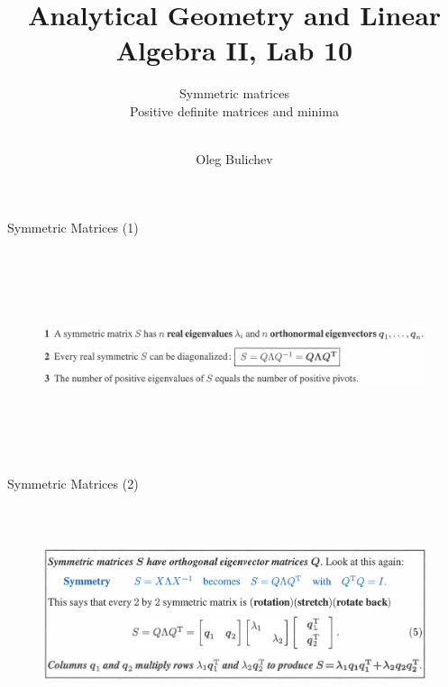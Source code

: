 \documentclass[aspectratio=169]{beamer}
\title[AGLA2]{Analytical Geometry and Linear Algebra II, Lab 10} %
\subtitle{Symmetric matrices \\ Positive definite matrices and minima \\ \ 
         } %
\author{Oleg Bulichev}
\newcommand{\fbckg}[1]{\usebackgroundtemplate{\texttt{[image: \#1]}}}%
\begin{document}
\setlength{\abovedisplayskip}{0pt}
\setlength{\belowdisplayskip}{0pt}
\setlength{\abovedisplayshortskip}{0pt}
\setlength{\belowdisplayshortskip}{0pt}

\fbckg{fibeamer/figs/title_page.png}

\fbckg{fibeamer/figs/common.png}

\begin{frame}[t]{Symmetric Matrices (1)}
\framesubtitle{}
    \begin{figure}[H]
        \centering\includegraphics[height=6cm,width=1\textwidth,keepaspectratio]{symmetric.png}
        \label{fig:symmetric.png}
    \end{figure}
\end{frame}

\begin{frame}[t]{Symmetric Matrices (2)}
    \framesubtitle{}
        \begin{figure}[H]
            \centering\includegraphics[height=6cm,width=1\textwidth,keepaspectratio]{symmetric_2.png}
            \label{fig:symmetric_2.png}
        \end{figure}
    \end{frame}
\end{document}
